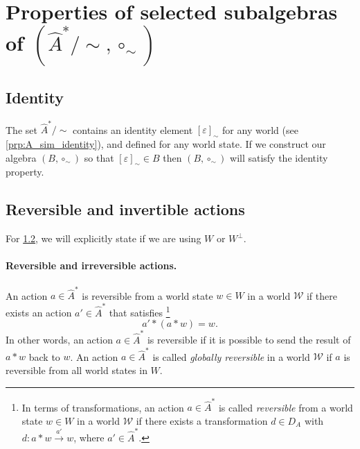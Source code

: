 \section{
Properties of selected subalgebras \texorpdfstring{of $(\hat{A}^{*}/\sim, \circ_{\sim})$}{}
}

\subsection{Identity}
The set $\hat{A}^{*}/\sim$ contains an identity element $[\varepsilon]_{\sim}$ for any world (see \cref{prp:A_sim_identity}), and defined for any world state.
If we construct our algebra $(B, \circ_{\sim})$ so that $[\varepsilon]_{\sim} \in B$ then $(B, \circ_{\sim})$ will satisfy the identity property.


\subsection{Reversible and invertible actions}\label{sec:Reversible and invertible actions}
For \cref{sec:Reversible and invertible actions}, we will explicitly state if we are using $W$ or $W^{\bot}$.
\paragraph{Reversible and irreversible actions.}
An action $a \in \hat{A}^{*}$ is reversible from a world state $w \in W$ in a world $\mathscr{W}$ if there exists an action $a' \in \hat{A}^{*}$ that satisfies
 \footnote{
In terms of transformations, an action $a \in \hat{A}^{*}$ is called \emph{reversible} from a world state $w \in W$ in a world $\mathscr{W}$ if there exists a transformation $d \in D_{A}$ with $d: a \ast w \xrightarrow{a'} w$, where $a' \in \hat{A}^{*}$.
}
\begin{equation}
    a' \ast (a \ast w) = w.
\end{equation}
In other words, an action $a \in \hat{A}^{*}$ is reversible if it is possible to send the result of $a \ast w$ back to $w$.
An action $a \in \hat{A}^{*}$ is called \emph{globally reversible} in a world $\mathscr{W}$ if $a$ is reversible from all world states in $W$.

